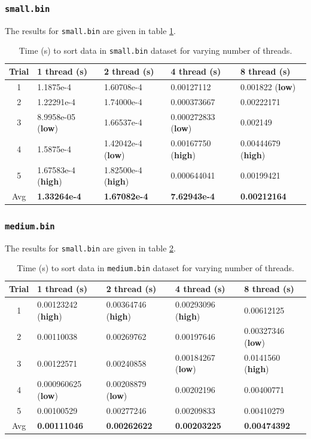 \documentclass[a4paper,12pt]{article}
\theoremstyle{definition}
\theoremstyle{remark}
\begin{document}
	\subsubsection{\texttt{small.bin}}
	The results for \texttt{small.bin} are given in table \ref{tab:small}.
		\begin{table}[h]
			\centering
			\begin{tabular}{|c|l|l|l|l|}
				\hline
				\textbf{Trial}& \textbf{1 thread (s)}  &\textbf{2 thread (s)}  &\textbf{4  thread (s)}  &\textbf{8 thread (s)}  \\
				\hline\hline
				1& 1.1875e-4 &1.60708e-4 &0.00127112  &  0.001822 (\textbf{low})\\
				2&  1.22291e-4 &1.74000e-4  &0.000373667  &  0.00222171\\
				3& 8.9958e-05 (\textbf{low})& 1.66537e-4 & 0.000272833 (\textbf{low}) &0.002149  \\
				4& 1.5875e-4 & 1.42042e-4 (\textbf{low}) & 0.00167750 (\textbf{high}) &0.00444679 (\textbf{high})\\
				5& 1.67583e-4  (\textbf{high})&1.82500e-4 (\textbf{high})  & 0.000644041  & 0.00199421 \\
				\hline
				Avg& \textbf{1.33264e-4} &\textbf{1.67082e-4} &\textbf{7.62943e-4} & \textbf{0.00212164}\\
				\hline
			\end{tabular}
			\caption{Time (s) to sort data in \texttt{small.bin} dataset for varying number of threads.}
			\label{tab:small}
		\end{table}

		
	
	\subsubsection{\texttt{medium.bin}}
		The results for \texttt{small.bin} are given in table \ref{tab:medium}.
	\begin{table}[h]
		\centering
		\begin{tabular}{|c|l|l|l|l|}
			\hline
			\textbf{Trial}& \textbf{1 thread (s)}  &\textbf{2 thread (s)}  &\textbf{4  thread (s)}  &\textbf{8 thread (s)}  \\
			\hline\hline
			1& 0.00123242 (\textbf{high})&0.00364746  (\textbf{high}) & 0.00293096  (\textbf{high})  & 0.00612125\\
			2&  0.00110038 &0.00269762 &0.00197646 &  0.00327346 (\textbf{low})\\
			3&0.00122571 & 0.00240858& 0.00184267  (\textbf{low}) &0.0141560  (\textbf{high})\\
			4&0.000960625 (\textbf{low}) & 0.00208879 (\textbf{low})  &  0.00202196 &0.00400771 \\
			5& 0.00100529  &0.00277246 &0.00209833  & 0.00410279 \\
			\hline
			Avg& \textbf{0.00111046} &\textbf{0.00262622} &\textbf{0.00203225} & \textbf{0.00474392}\\
			\hline
		\end{tabular}
		\caption{Time (s) to sort data in \texttt{medium.bin} dataset for varying number of threads.}
		\label{tab:medium}
	\end{table}
\end{document}
